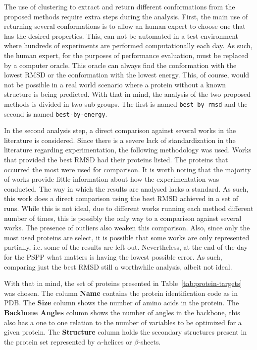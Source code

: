 The use of clustering to extract and return different conformations from the
proposed methods require extra steps during the analysis. First, the main use of
returning several conformations is to allow an human expert to choose one that
has the desired properties. This, can not be automated in a test environment where
hundreds of experiments are performed computationally each day. As such, the human
expert, for the purposes of performance evaluation, must be replaced by a
computer oracle. This oracle can always find the conformation with the lowest
RMSD or the conformation with the lowest energy. This, of course, would not
be possible in a real world scenario where a protein without a known structure is
being predicted. With that in mind, the analysis of the two proposed methods is
divided in two sub groups. The first is named \texttt{best-by-rmsd} and the second
is named \texttt{best-by-energy}.

In the second analysis step, a direct comparison against several works in the
literature is considered. Since there is a severe lack of standardization in the
literature regarding experimentation, the following methodology was used. Works
that provided the best RMSD had their proteins listed. The proteins that occurred
the most were used for comparison. It is worth noting that the majority of works
provide little information about how the experimentation was conducted. The way
in which the results are analysed lacks a standard. As such, this work does a
direct comparison using the best RMSD achieved in a set of runs. While this is
not ideal, due to different works running each method different number of times,
this is possibly the only way to a comparison against several works. The presence
of outliers also weaken this comparison. Also, since only the most used proteins
are select, it is possible that some works are only represented partially, i.e.
some of the results are left out. Nevertheless, at the end of the day for the
PSPP what matters is having the lowest possible error. As such, comparing just
the best RMSD still a worthwhile analysis, albeit not ideal.

With that in mind, the set of proteins presented in Table~\ref{tab:protein-targets}
was chosen. The column \textbf{Name} contains the protein identification code
as in PDB.  The \textbf{Size} column shows the number of amino acids in the protein.
The \textbf{Backbone Angles} column shows the number of angles in the backbone,
this also has a one to one relation to the number of variables to be optimized
for a given protein. The \textbf{Structure} column holds the secondary
structures present in the protein set represented by $\alpha$-helices or
$\beta$-sheets.

